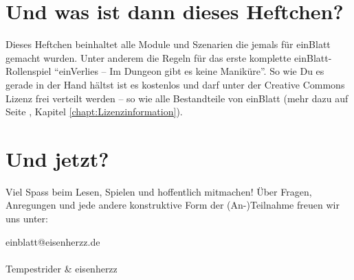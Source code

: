 \section {Und was ist dann dieses Heftchen?}
Dieses Heftchen beinhaltet alle Module und Szenarien die jemals für einBlatt gemacht wurden. Unter anderem die Regeln für das erste komplette einBlatt-Rollenspiel "`einVerlies -- Im Dungeon gibt es keine Maniküre"'. So wie Du es gerade in der Hand hältst ist es kostenlos und darf unter der Creative Commons Lizenz frei verteilt werden -- so wie alle Bestandteile von einBlatt (mehr dazu auf Seite \pageref {chapt:Lizenzinformation}, Kapitel \ref {chapt:Lizenzinformation}).

\section {Und jetzt?}
Viel Spass beim Lesen, Spielen und hoffentlich mitmachen! Über Fragen, Anregungen und jede andere konstruktive Form der (An-)Teilnahme freuen wir uns unter:

\Letter einblatt@eisenherzz.de
\\
\\
Tempestrider \& eisenherzz

